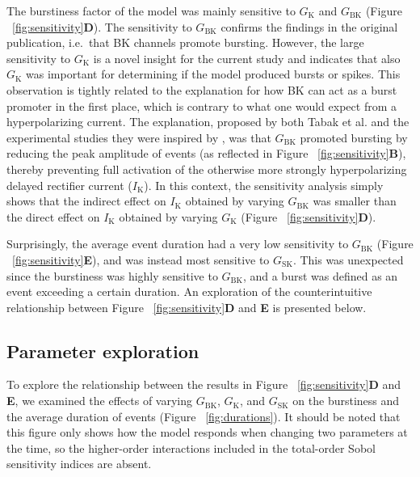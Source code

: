 \documentclass[10pt,a4paper,onecolumn]{article}
\begin{document}
The burstiness factor of the model was mainly sensitive to
\(G_{\mathrm{K}}\) and \(G_{\mathrm{BK}}\) (Figure
~\ref{fig:sensitivity}\textbf{D}). The sensitivity to
\(G_{\mathrm{BK}}\) confirms the findings in the original publication,
i.e.~that BK channels promote bursting. However, the large sensitivity
to \(G_{\mathrm{K}}\) is a novel insight for the current study and
indicates that also \(G_{\mathrm{K}}\) was important for determining if
the model produced bursts or spikes. This observation is tightly related
to the explanation for how BK can act as a burst promoter in the first
place, which is contrary to what one would expect from a hyperpolarizing
current. The explanation, proposed by both Tabak et al.
\autocite{tabak2011} and the experimental studies they were inspired by
\autocite{vangoor2001}, was that \(G_{\mathrm{BK}}\) promoted bursting
by reducing the peak amplitude of events (as reflected in Figure
~\ref{fig:sensitivity}\textbf{B}), thereby preventing full activation of
the otherwise more strongly hyperpolarizing delayed rectifier current
(\(I_{\mathrm{K}}\)). In this context, the sensitivity analysis simply
shows that the indirect effect on \(I_{\mathrm{K}}\) obtained by varying
\(G_{\mathrm{BK}}\) was smaller than the direct effect on
\(I_{\mathrm{K}}\) obtained by varying \(G_{\mathrm{K}}\) (Figure
~\ref{fig:sensitivity}\textbf{D}).

Surprisingly, the average event duration had a very low sensitivity to
\(G_{\mathrm{BK}}\) (Figure ~\ref{fig:sensitivity}\textbf{E}), and was
instead most sensitive to \(G_{\mathrm{SK}}\). This was unexpected since
the burstiness was highly sensitive to \(G_{\mathrm{BK}}\), and a burst
was defined as an event exceeding a certain duration. An exploration of
the counterintuitive relationship between Figure
~\ref{fig:sensitivity}\textbf{D} and \textbf{E} is presented below.

\subsection{Parameter exploration}\label{parameter-exploration}

To explore the relationship between the results in Figure
~\ref{fig:sensitivity}\textbf{D} and \textbf{E}, we examined the effects
of varying \(G_\mathrm{BK}\), \(G_{\mathrm{K}}\), and
\(G_{\mathrm{SK}}\) on the burstiness and the average duration of events
(Figure ~\ref{fig:durations}). It should be noted that this figure only
shows how the model responds when changing two parameters at the time,
so the higher-order interactions included in the total-order Sobol
sensitivity indices are absent.
\end{document}
